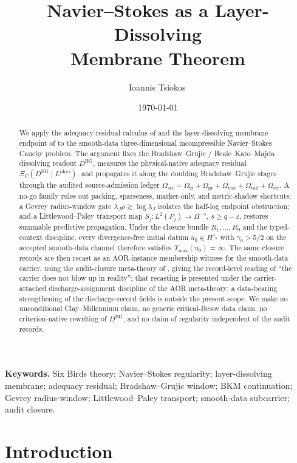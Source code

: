 \documentclass[11pt]{article}
\title{Navier--Stokes as a Layer-Dissolving\\ Membrane Theorem}
\author{Ioannis Tsiokos\,\orcidlink{0009-0009-7659-5964}}
\date{\today}
\newcommand{\XiRes}{\Xi}
\newcommand{\eps}{\varepsilon}
\newcommand{\DBG}{D^{\mathrm{BG}}}
\newcommand{\Lphys}{L^{\mathrm{phys}}}
\newcommand{\Tmax}{T_{\max}}
\newcommand{\Omsrc}{\Omega_{\mathrm{src}}}
\newcommand{\Omtr}{\Omega_{\mathrm{tr}}}
\newcommand{\Ompr}{\Omega_{\mathrm{pr}}}
\newcommand{\Omvisc}{\Omega_{\mathrm{visc}}}
\newcommand{\Omtail}{\Omega_{\mathrm{tail}}}
\newcommand{\Omstr}{\Omega_{\mathrm{str}}}
\newcommand{\lambdaJ}{\lambda_J}
\newcommand{\LPtr}{S_j}
\theoremstyle{definition}
\begin{document}
\maketitle
\thispagestyle{firstpage}

\begin{abstract}
We apply the adequacy-residual calculus of
\citet{Tsiokos2026XiCompanion} and the layer-dissolving membrane
endpoint of \citet{Tsiokos2026NeedleKiller} to the smooth-data
three-dimensional incompressible Navier--Stokes Cauchy problem.  The
argument fixes the Bradshaw--Grujic / Beale--Kato--Majda dissolving
readout \(\DBG\), measures the physical-native adequacy residual
\(\XiRes_C(\DBG\mid\Lphys)\), and propagates it along the doubling
Bradshaw--Grujic stages through the audited source-admission ledger
\(\Omsrc=\Omtr+\Ompr+\Omvisc+\Omtail+\Omstr\).  A no-go family rules
out packing, sparseness, marker-only, and metric-shadow shortcuts; a
Gevrey radius-window gate \(\lambdaJ\rho\gtrsim\log\lambdaJ\) isolates
the half-log endpoint obstruction; and a Littlewood--Paley transport
map \(\LPtr\colon L^2(P_j)\to H^{-s}\), \(s\ge q-\eps\), restores
summable predictive propagation.  Under the closure bundle
\(R_1,\ldots,R_9\) and the typed-context discipline, every
divergence-free initial datum \(u_0\in H^{\gamma_0}\) with
\(\gamma_0>5/2\) on the accepted smooth-data channel therefore
satisfies \(\Tmax(u_0)=\infty\).  The same closure records are then
recast as an AOR-instance membership witness for the smooth-data
carrier, using the audit-closure meta-theory of
\citet{Tsiokos2026AOR}, giving the record-level reading of ``the
carrier does not blow up in reality''; that recasting is presented
under the carrier-attached discharge-assignment discipline of the AOR
meta-theory; a data-bearing strengthening of the discharge-record
fields is outside the present scope.  We make no unconditional
Clay--Millennium claim, no generic critical-Besov data claim, no
criterion-native rewriting of \(\DBG\), and no claim of regularity
independent of the audit records.
\end{abstract}

\medskip
\noindent\textbf{Keywords.} Six Birds theory; Navier--Stokes regularity; layer-dissolving membrane; adequacy residual; Bradshaw--Grujic window; BKM continuation; Gevrey radius-window; Littlewood--Paley transport; smooth-data subcarrier; audit closure.



\section{Introduction}
\label{sec:intro}
\end{document}
